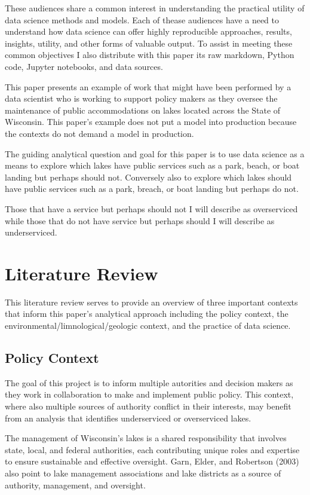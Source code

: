 \documentclass[
]{article}
\begin{document}
These audiences share a common interest in understanding the practical
utility of data science methods and models. Each of thease audiences
have a need to understand how data science can offer highly reproducible
approaches, results, insights, utility, and other forms of valuable
output. To assist in meeting these common objectives I also distribute
with this paper its raw markdown, Python code, Jupyter notebooks, and
data sources.

This paper presents an example of work that might have been performed by
a data scientist who is working to support policy makers as they oversee
the maintenance of public accommodations on lakes located across the
State of Wisconsin. This paper's example does not put a model into
production because the contexts do not demand a model in production.

The guiding analytical question and goal for this paper is to use data
science as a means to explore which lakes have public services such as a
park, beach, or boat landing but perhaps should not. Conversely also to
explore which lakes should have public services such as a park, breach,
or boat landing but perhaps do not.

Those that have a service but perhaps should not I will describe as
overserviced while those that do not have service but perhaps should I
will describe as underserviced.

\section{Literature Review}\label{literature-review}

This literature review serves to provide an overview of three important
contexts that inform this paper's analytical approach including the
policy context, the environmental/limnological/geologic context, and the
practice of data science.

\subsection{Policy Context}\label{policy-context}

The goal of this project is to inform multiple autorities and decision
makers as they work in collaboration to make and implement public
policy. This context, where also multiple sources of authority conflict
in their interests, may benefit from an analysis that identifies
underserviced or overserviced lakes.

The management of Wisconsin's lakes is a shared responsibility that
involves state, local, and federal authorities, each contributing unique
roles and expertise to ensure sustainable and effective oversight. Garn,
Elder, and Robertson (2003) also point to lake management associations
and lake districts as a source of authority, management, and oversight.
\end{document}
